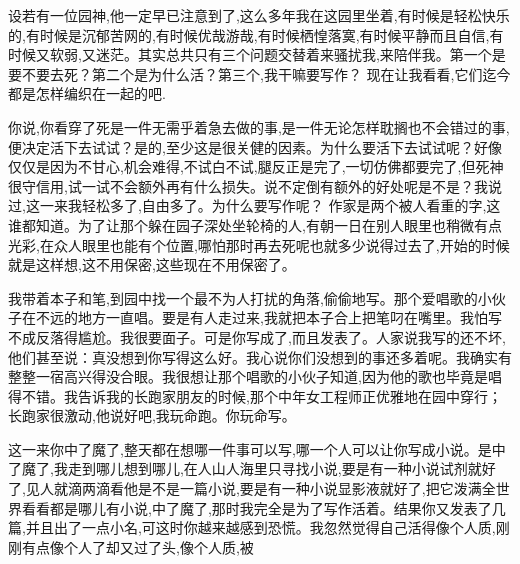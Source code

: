 \documentclass{ctexart}
\renewcommand{\\}{\par}
\begin{document}
\\设若有一位园神,他一定早已注意到了,这么多年我在这园里坐着,有时候是轻松快乐的,有时候是沉郁苦网的,有时候优哉游哉,有时候栖惶落寞,有时候平静而且自信,有时候又软弱,又迷茫。其实总共只有三个问题交替着来骚扰我,来陪伴我。第一个是要不要去死？第二个是为什么活？第三个,我干嘛要写作？ 现在让我看看,它们迄今都是怎样编织在一起的吧.\\你说,你看穿了死是一件无需乎着急去做的事,是一件无论怎样耽搁也不会错过的事,便决定活下去试试？是的,至少这是很关健的因素。为什么要活下去试试呢？好像仅仅是因为不甘心,机会难得,不试白不试,腿反正是完了,一切仿佛都要完了,但死神很守信用,试一试不会额外再有什么损失。说不定倒有额外的好处呢是不是？我说过,这一来我轻松多了,自由多了。为什么要写作呢？ 作家是两个被人看重的字,这谁都知道。为了让那个躲在园子深处坐轮椅的人,有朝一日在别人眼里也稍微有点光彩,在众人眼里也能有个位置,哪怕那时再去死呢也就多少说得过去了,开始的时候就是这样想,这不用保密,这些现在不用保密了。 \\我带着本子和笔,到园中找一个最不为人打扰的角落,偷偷地写。那个爱唱歌的小伙子在不远的地方一直唱。要是有人走过来,我就把本子合上把笔叼在嘴里。我怕写不成反落得尴尬。我很要面子。可是你写成了,而且发表了。人家说我写的还不坏,他们甚至说：真没想到你写得这么好。我心说你们没想到的事还多着呢。我确实有整整一宿高兴得没合眼。我很想让那个唱歌的小伙子知道,因为他的歌也毕竟是唱得不错。我告诉我的长跑家朋友的时候,那个中年女工程师正优雅地在园中穿行；长跑家很激动,他说好吧,我玩命跑。你玩命写。\\这一来你中了魔了,整天都在想哪一件事可以写,哪一个人可以让你写成小说。是中了魔了,我走到哪儿想到哪儿,在人山人海里只寻找小说,要是有一种小说试剂就好了,见人就滴两滴看他是不是一篇小说,要是有一种小说显影液就好了,把它泼满全世界看看都是哪儿有小说,中了魔了,那时我完全是为了写作活着。结果你又发表了几篇,并且出了一点小名,可这时你越来越感到恐慌。我忽然觉得自己活得像个人质,刚刚有点像个人了却又过了头,像个人质,被
\end{document}
